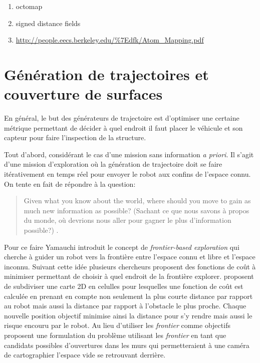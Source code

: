 \color{red}
\begin{enumerate}
  \item octomap
  \item signed distance fields
  \item \url{http://people.eecs.berkeley.edu/%7Edfk/Atom_Mapping.pdf}
\end{enumerate}
\color{black}

\section{Génération de trajectoires et couverture de surfaces}\label{subsec:generation}

En général, le but des générateurs de trajectoire est d'optimiser une certaine métrique permettant de décider à quel endroit il faut placer le véhicule et son capteur pour faire l'inspection de la structure.

Tout d'abord, considérant le cas d'une mission sans information \textit{a priori}. Il s'agit d'une mission d'exploration où la génération de trajectoire doit se faire itérativement en temps réel pour envoyer le robot aux confins de l'espace connu. On tente en fait de répondre à la question:

\begin{quote}
  Given what you know about the world, where should you move to gain as much new information as possible? (Sachant ce que nous savons à propos du monde, où devrions nous aller pour gagner le plus d'information possible?) \citep{Yamauchi1997}.
\end{quote}

Pour ce faire Yamauchi introduit le concept de \textit{frontier-based exploration} qui cherche à guider un robot vers la frontière entre l'espace connu et libre et l'espace inconnu. Suivant cette idée plusieurs chercheurs proposent des fonctions de coût à minimiser permettant de choisir à quel endroit de la frontière explorer. \citep{Wirth2007} proposent de subdiviser une carte 2D en celulles pour lesquelles une fonction de coût est calculée en prenant en compte non seulement la plus courte distance par rapport au robot mais aussi la distance par rapport à l'obstacle le plus proche. Chaque nouvelle position objectif minimise ainsi la distance pour s'y rendre mais aussi le risque encouru par le robot. Au lieu d'utiliser les \textit{frontier} comme objectifs \citep{Dornhege2011} proposent une formulation du problème utilisant les \textit{frontier} en tant que candidats possibles d'ouvertures dans les murs qui permetteraient à une caméra de cartographier l'espace vide se retrouvant derrière.

